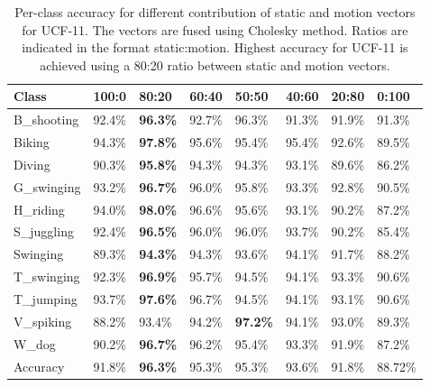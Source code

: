 \begin{table*}[]
\centering
\caption{Per-class accuracy for different contribution of static and motion vectors for UCF-11. The vectors are fused using Cholesky method. Ratios are indicated in the
format static:motion. Highest accuracy for UCF-11 is achieved using a
80:20 ratio between static and motion vectors.}\label{tbl:rho ucf}
\begin{tabular}{|l||l|l|l|l|l|l|l|}
\hline
Class           & 100:0  & 80:20     & 60:40   & 50:50    & 40:60     & 20:80   & 0:100 \\ \hline  \hline
B\_shooting      & 92.4\% & \textbf{96.3\%}   & 92.7\%  &  96.3\%  &  91.3\%   & 91.9\%  & 91.3\%  \\
Biking          & 94.3\% &  \textbf{97.8\%}   & 95.6\%  &  95.4\%  &  95.4\%   & 92.6\%  & 89.5\%   \\
Diving          & 90.3\% &  \textbf{95.8\%}   & 94.3\%  &  94.3\%  &  93.1\%   &  89.6\% & 86.2\%  \\
G\_swinging      & 93.2\% & \textbf{96.7\%}   &  96.0\% &  95.8\%  &  93.3\%   &  92.8\% & 90.5\% \\
H\_riding        & 94.0\% &  \textbf{98.0\%}   &  96.6\% &  95.6\%  &  93.1\%   &  90.2\% & 87.2\% \\
S\_juggling      & 92.4\%&  \textbf{96.5\%}    & 96.0\%  &  96.0\%  &  93.7\%   &  90.2\% & 85.4\%  \\
Swinging        & 89.3\%&  \textbf{94.3\%}    & 94.3\%  &  93.6\%  &  94.1\%   &  91.7\% & 88.2\% \\
T\_swinging      & 92.3\%& \textbf{96.9\% }    &  95.7\% &  94.5\%  &  94.1\%   &  93.3\% &  90.6\% \\
T\_jumping       & 93.7\%&  \textbf{97.6\%}    &  96.7\% &  94.5\%  &  94.1\%   &  93.1\% & 90.6\% \\
V\_spiking       & 88.2\%&  93.4\%    &  94.2\% &  \textbf{97.2\%}  &  94.1\%   &  93.0\% & 89.3\% \\
W\_dog           & 90.2\%&  \textbf{96.7\% }   &   96.2\%&  95.4\%  &  93.3\%   &  91.9\% & 87.2\% \\  \hline
Accuracy        &   91.8\%&  \textbf{96.3\%}    &   95.3\%&  95.3\%  &  93.6\%   & 91.8\%  & 88.72\%  \\ \hline
\end{tabular}
\end{table*}

